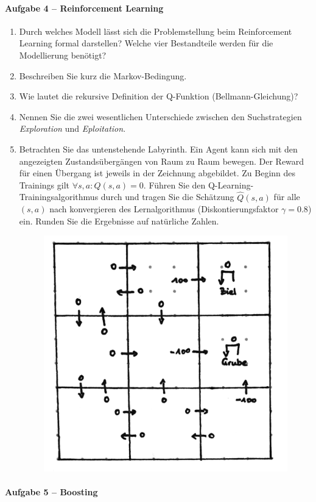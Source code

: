 \documentclass[fleqn]{latex-classes/summary}
\begin{document}
\paragraph{Aufgabe 4 -- Reinforcement Learning}

\begin{enumerate}
  \item Durch welches Modell lässt sich die Problemstellung beim Reinforcement Learning formal darstellen? Welche vier Bestandteile werden für die Modellierung benötigt?
  \item Beschreiben Sie kurz die Markov-Bedingung.
  \item Wie lautet die rekursive Definition der Q-Funktion (Bellmann-Gleichung)?
  \item Nennen Sie die zwei wesentlichen Unterschiede zwischen den Suchstrategien \emph{Exploration} und \emph{Eploitation}.
  \item Betrachten Sie das untenstehende Labyrinth. Ein Agent kann sich mit den angezeigten Zustandsübergängen von Raum zu Raum bewegen. Der Reward für einen Übergang ist jeweils in der Zeichnung abgebildet. Zu Beginn des Trainings gilt \( \forall s, a : Q(s,a) = 0 \). Führen Sie den Q-Learning-Trainingsalgorithmus durch und tragen Sie die Schätzung \( \hat{Q}(s,a) \) für alle \( (s,a) \) nach konvergieren des Lernalgorithmus (Diskontierungsfaktor \( \gamma = 0.8 \)) ein. Runden Sie die Ergebnisse auf natürliche Zahlen.
  
  \begin{figure}[H]
    \centering
    \includegraphics[width=.6\linewidth]{assets/img/q.png}
  \end{figure}
\end{enumerate}

\newpage

\paragraph{Aufgabe 5 -- Boosting}
\end{document}
